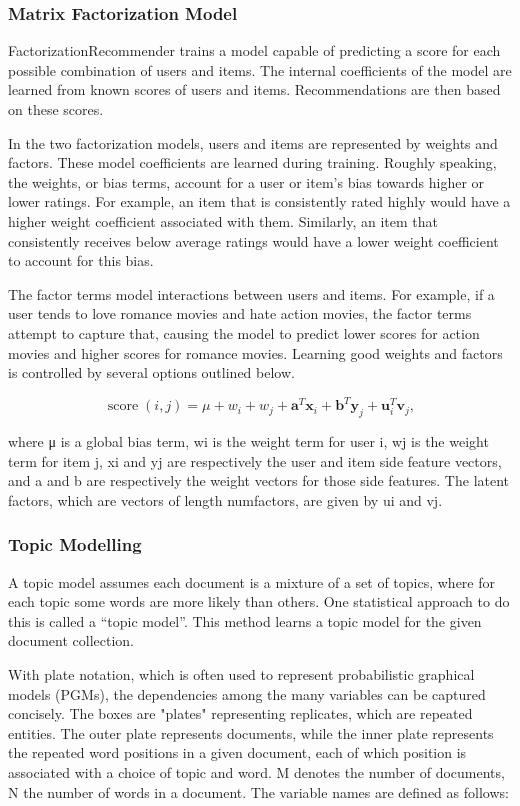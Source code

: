 \subsubsection{Matrix Factorization Model}
FactorizationRecommender trains a model capable of predicting a score for each possible combination of users and items. The internal coefficients of the model are learned from known scores of users and items. Recommendations are then based on these scores.

In the two factorization models, users and items are represented by weights and factors. These model coefficients are learned during training. Roughly speaking, the weights, or bias terms, account for a user or item’s bias towards higher or lower ratings. For example, an item that is consistently rated highly would have a higher weight coefficient associated with them. Similarly, an item that consistently receives below average ratings would have a lower weight coefficient to account for this bias.

The factor terms model interactions between users and items. For example, if a user tends to love romance movies and hate action movies, the factor terms attempt to capture that, causing the model to predict lower scores for action movies and higher scores for romance movies. Learning good weights and factors is controlled by several options outlined below.

\[
  \operatorname{score}(i, j) =
   \mu + w_i + w_j
   + \mathbf{a}^T \mathbf{x}_i + \mathbf{b}^T \mathbf{y}_j
   + {\mathbf u}_i^T {\mathbf v}_j,
\]

where μ is a global bias term, wi is the weight term for user i, wj is the weight term for item j, xi and yj are respectively the user and item side feature vectors, and a and b are respectively the weight vectors for those side features. The latent factors, which are vectors of length numfactors, are given by ui and vj.

\subsubsection{Topic Modelling}

A topic model assumes each document is a mixture of a set of topics, where for each topic some words are more likely than others. One statistical approach to do this is called a “topic model”. This method learns a topic model for the given document collection.

With plate notation, which is often used to represent probabilistic graphical models (PGMs), the dependencies among the many variables can be captured concisely. The boxes are "plates" representing replicates, which are repeated entities. The outer plate represents documents, while the inner plate represents the repeated word positions in a given document, each of which position is associated with a choice of topic and word. M denotes the number of documents, N the number of words in a document. The variable names are defined as follows:

